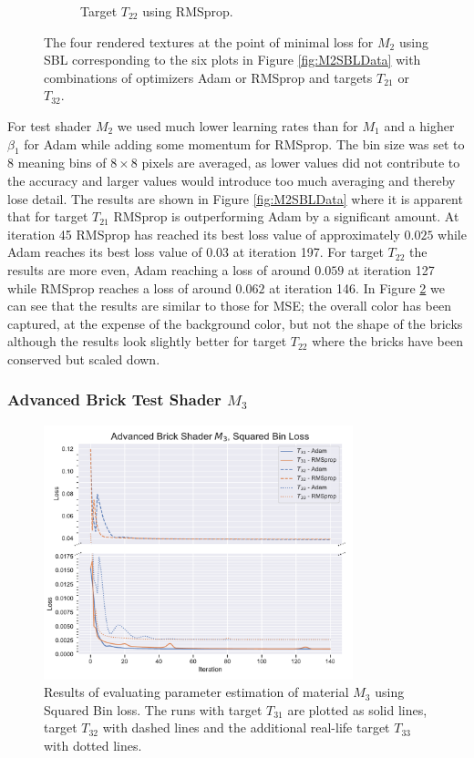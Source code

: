 \begin{figure}[h]
\begin{subfigure}[t]{.25\textwidth}
    \caption{Target $T_{22}$ using RMSprop.}
    \label{fig:M2SBLFinalRendersRandomRMSprop}
\end{subfigure}
\caption{The four rendered textures at the point of minimal loss for $M_2$ using SBL corresponding to the six plots in Figure \ref{fig:M2SBLData} with combinations of optimizers Adam or RMSprop and targets $T_{21}$ or $T_{32}$.}
\label{fig:M2SBLFinalRenders}
\end{figure}

For test shader $M_2$ we used much lower learning rates than for $M_1$ and a higher $\beta_1$ for Adam while adding some momentum for RMSprop. The bin size was set to $8$ meaning bins of $8\times 8$ pixels are averaged, as lower values did not contribute to the accuracy and larger values would introduce too much averaging and thereby lose detail. The results are shown in Figure \ref{fig:M2SBLData} where it is apparent that for target $T_{21}$ RMSprop is outperforming Adam by a significant amount. At iteration 45 RMSprop has reached its best loss value of approximately $0.025$ while Adam reaches its best loss value of $0.03$ at iteration 197. For target $T_{22}$ the results are more even, Adam reaching a loss of around $0.059$ at iteration 127 while RMSprop reaches a loss of around $0.062$ at iteration 146. In Figure \ref{fig:M2SBLFinalRenders} we can see that the results are similar to those for MSE; the overall color has been captured, at the expense of the background color, but not the shape of the bricks although the results look slightly better for target $T_{22}$ where the bricks have been conserved but scaled down.

\subsubsection{Advanced Brick Test Shader $M_3$}

\begin{figure}[hp]
    \centering
    \includegraphics[width=0.8\textwidth]{img/evaluation/M3/ABS_SBL.pdf}
    \caption{Results of evaluating parameter estimation of material $M_3$ using Squared Bin loss. The runs with target $T_{31}$ are plotted as solid lines, target $T_{32}$ with dashed lines and the additional real-life target $T_{33}$ with dotted lines.}
    \label{fig:M3SBLData}
\end{figure}

